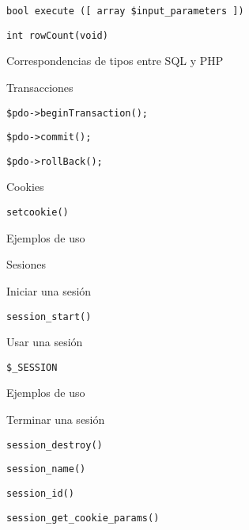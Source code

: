 \begin{longenum}
\begin{longenum}
\begin{longenum}
\begin{longenum}
                \item \texttt{bool execute ([ array \$input\_parameters ])}
                \item \texttt{int rowCount(void)}
            \end{longenum}
            \item Correspondencias de tipos entre SQL y PHP
            \item Transacciones
            \begin{longenum}
                \item \texttt{\$pdo->beginTransaction();}
                \item \texttt{\$pdo->commit();}
                \item \texttt{\$pdo->rollBack();}
            \end{longenum}
        \end{longenum}
        \item Cookies
        \begin{longenum}
            \item \texttt{setcookie()}
            \item Ejemplos de uso
        \end{longenum}
        \item Sesiones
        \begin{longenum}
            \item Iniciar una sesión
            \begin{longenum}
                \item \texttt{session\_start()}
            \end{longenum}
            \item Usar una sesión
            \begin{longenum}
                \item \texttt{\$\_SESSION}
                \item Ejemplos de uso
            \end{longenum}
            \item Terminar una sesión
            \begin{longenum}
                \item \texttt{session\_destroy()}
                \item \texttt{session\_name()}
                \item \texttt{session\_id()}
                \item \texttt{session\_get\_cookie\_params()}
            \end{longenum}

\end{longenum}
\end{longenum}
\end{longenum}
